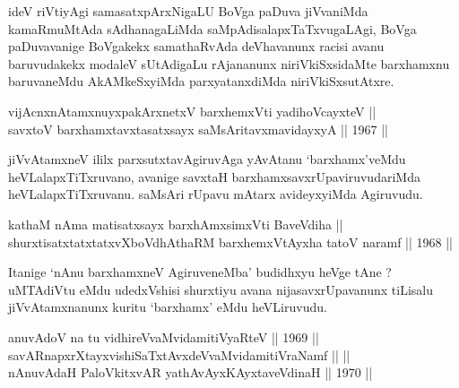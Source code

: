 \begin{artha}
ideV riVtiyAgi samasatxpArxNigaLU BoVga paDuva jiVvaniMda kamaRmuMtAda
sAdhanagaLiMda saMpAdisalapxTaTxvugaLAgi, BoVga paDuvavanige BoVgakekx
samathaRvAda deVhavanunx racisi avanu baruvudakekx modaleV sUtAdigaLu
rAjananunx niriVkiSxsidaMte barxhamxnu baruvaneMdu AkAMkeSxyiMda
parxyatanxdiMda niriVkiSxsutAtxre.
\end{artha}


\begin{shl}
vijAcnxnAtamxnuyxpakArxnetxV barxhemxVti yadihoVcayxteV || \\
savxtoV barxhamxtavxtasatxsayx saMsAritavxmavidayxyA \hfill || 1967 ||
  
\end{shl}

\begin{artha}
jiVvAtamxneV ililx parxsutxtavAgiruvAga yAvAtanu `barxhamx'veMdu
heVLalapxTiTxruvano, avanige savxtaH barxhamxsavxrUpaviruvudariMda
heVLalapxTiTxruvanu. saMsAri rUpavu mAtarx avideyxyiMda Agiruvudu.
\end{artha}


\begin{shl}
kathaM nAma matisatxsayx barxhAmxsimxVti BaveVdiha || \\
shurxtisatxtatxtatxvXboVdhAthaRM barxhemxVtAyxha tatoV naramf \hfill || 1968 ||
  
\end{shl}

\begin{artha}
Itanige `nAnu barxhamxneV AgiruveneMba' budidhxyu heVge tAne ?
uMTAdiVtu eMdu udedxVshisi shurxtiyu avana nijasavxrUpavanunx tiLisalu
jiVvAtamxnanunx kuritu `barxhamx' eMdu heVLiruvudu.
\end{artha}


\begin{shl}
anuvAdoV na tu vidhireVvaMvidamitiVyaRteV \hfill || 1969 ||\\
\footnotemark[1]savARnapxrXtayxvishiSaTxtAvxdeVvaMvidamitiVraNamf ||  || \\
nAnuvAdaH PaloVkitxvAR yathAvAyxKAyxtaveVdinaH \hfill || 1970 ||
  
\end{shl}


